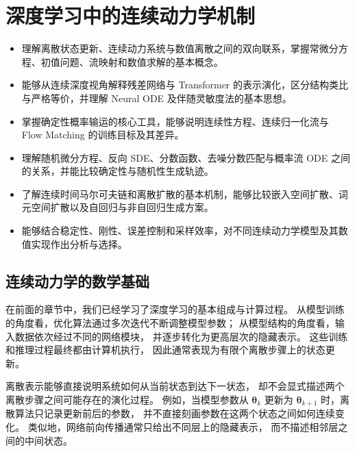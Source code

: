 
\chapter{深度学习中的连续动力学机制}

\begin{learninggoals}
  \begin{itemize}
    \item 理解离散状态更新、连续动力系统与数值离散之间的双向联系，掌握常微分方程、初值问题、流映射和数值求解的基本概念。
    \item 能够从连续深度视角解释残差网络与 Transformer 的表示演化，区分结构类比与严格等价，并理解 Neural ODE 及伴随灵敏度法的基本思想。
    \item 掌握确定性概率输运的核心工具，能够说明连续性方程、连续归一化流与 Flow Matching 的训练目标及其差异。
    \item 理解随机微分方程、反向 SDE、分数函数、去噪分数匹配与概率流 ODE 之间的关系，并能比较确定性与随机性生成轨迹。
    \item 了解连续时间马尔可夫链和离散扩散的基本机制，能够比较嵌入空间扩散、词元空间扩散以及自回归与非自回归生成方案。
    \item 能够结合稳定性、刚性、误差控制和采样效率，对不同连续动力学模型及其数值实现作出分析与选择。
  \end{itemize}
\end{learninggoals}

\section{连续动力学的数学基础}
\label{sec:discrete-to-continuous-dynamics}

在前面的章节中，我们已经学习了深度学习的基本组成与计算过程。
从模型训练的角度看，优化算法通过多次迭代不断调整模型参数；
从模型结构的角度看，输入数据依次经过不同的网络模块，
并逐步转化为更高层次的隐藏表示。
这些训练和推理过程最终都由计算机执行，
因此通常表现为有限个离散步骤上的状态更新。

离散表示能够直接说明系统如何从当前状态到达下一状态，
却不会显式描述两个离散步骤之间可能存在的演化过程。
例如，当模型参数从
\(\boldsymbol{\theta}_k\)
更新为
\(\boldsymbol{\theta}_{k+1}\)
时，离散算法只记录更新前后的参数，
并不直接刻画参数在这两个状态之间如何连续变化。
类似地，网络前向传播通常只给出不同层上的隐藏表示，
而不描述相邻层之间的中间状态。

